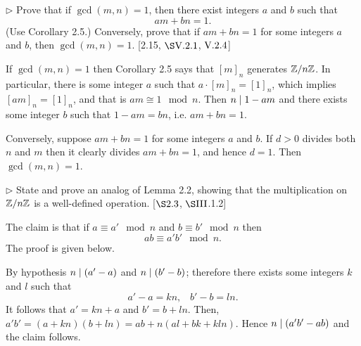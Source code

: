\begin{exercise}
	$\triangleright$ Prove that if $\gcd(m,n) = 1$, then there exist integers $a$ and $b$ such that 
	\[
		am + bn = 1.
	\]
	(Use Corollary 2.5.) Conversely, prove that if $am+bn = 1$ for some integers $a$ and $b$, then $\gcd(m,n) = 1$. [2.15, $\S \RNo{5}.2.1$, $\RNo{5}.2.4$]
\end{exercise}
\begin{solution}
	If $\gcd(m,n) = 1$ then Corollary 2.5 says that $[m]_n$ generates $\mathbb{Z}/n\mathbb{Z}$. In particular, there is some integer $a$ such that $a\cdot[m]_n = [1]_n$, which implies $[am]_n = [1]_n$, and that is $am\cong 1 \mod n$. Then $n\mid 1-am$ and there exists some integer $b$ such that $1-am = bn$, i.e. $am + bn = 1$. 
	
	Conversely, suppose $am+bn = 1$ for some integers $a$ and $b$. If $d>0$ divides both $n$ and $m$ then it clearly divides $am +bn = 1$, and hence $d = 1$. Then $\gcd(m,n) = 1$.
\end{solution}

\begin{exercise}
	$\triangleright$ State and prove an analog of Lemma 2.2, showing that the multiplication on $\mathbb{Z}/n\mathbb{Z}$ is a well-defined operation. [$\S 2.3$, $\S \RNo{3}$.1.2]
\end{exercise}
\begin{solution}
	The claim is that if $a \equiv a' \mod n$ and $b\equiv b' \mod n$ then 
	\[
		ab \equiv a'b' \mod n.
	\]
	The proof is given below.
	
	By hypothesis $n\mid (a'-a)$ and $n\mid (b' - b)$; therefore there exists some integers $k$ and $l$ such that 
	\[
		a'-a = kn, \;\;\; b' - b = ln.
	\]
	It follows that $a' = kn + a$ and $b' = b+ln$. Then, $a'b' = (a+kn)(b+ln) = ab+ n(al + bk + kln)$. Hence $n\mid (a'b' - ab)$ and the claim follows.
\end{solution}

